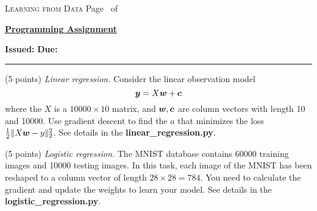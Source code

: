 \documentclass[a4paper, 12pt, answers]{exam}
\begin{document}
\pagestyle{headandfoot}
\runningheadrule


\setcounter{psctr}{1} %

              {\textsc{Learning from Data}}
              { Page \thepage\ of \numpages}
\firstpagefooter{}{}{}
\runningfooter{}{}{}


\newenvironment{Sequation}
   {\stepcounter{Sequ}%
     \addtocounter{equation}{-1}%
     \renewcommand\theequation{S\arabic{Sequ}}\equation}
   {\endequation}

\centering

\centering
\renewcommand{\thequestion}{\arabic{psctr}.\arabic{question}}
\courseheader

\begin{center}
  \underline{\bf Programming Assignment \thepsctr} \\
\end{center}
\begin{flushleft}
  \textbf{Issued:}  \hfill
  \textbf{Due:}  
\end{flushleft}

\hrule 



\vspace{1em}



\begin{questions}
\question (5 points) \emph{Linear regression.} Consider the linear observation model
\begin{equation*}
\bm{y} = X\bm{w} + \bm{c}
\end{equation*}
where the $X$ is a $10000 \times 10$ matrix, and $\bm{w},\bm{c}$ are column vectors with length 10 and 10000. Use gradient descent to find the $a$ that minimizes the loss $\frac12 \|X\bm{w}-y\|^2_2$. See details in the \textbf{linear\_regression.py}.



\question (5 points) \emph{Logistic regression.} The MNIST database contains 60000 training images and 10000 testing images. In this task, each image of the MNIST has been reshaped to a column vector of length $28\times28=784$. You need to calculate the gradient and update the weights to learn your model. See details in the \textbf{logistic\_regression.py}.

\end{questions}
\end{document}
